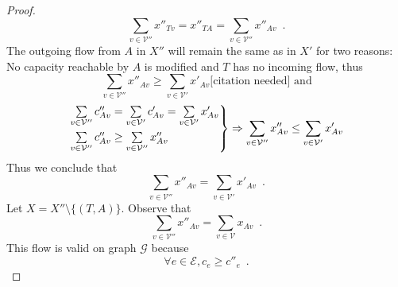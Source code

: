 \documentclass[11pt]{llncs}
\begin{document}
\begin{proof}
       \begin{equation}
          \sum\limits_{v \in \mathcal{V}''}x''_{Tv} = x''_{TA} = \sum\limits_{v \in \mathcal{V}''}x''_{Av} \enspace.
       \end{equation}
       The outgoing flow from $A$ in $X''$ will remain the same as in $X'$ for two reasons: \\
       No capacity reachable by $A$ is modified and $T$ has no incoming flow, thus
       \begin{equation}
          \sum\limits_{v \in \mathcal{V}''}x''_{Av} \geq \sum\limits_{v \in \mathcal{V}'}x'_{Av} \mbox{[citation needed] and}
       \end{equation}
       \begin{equation}
          \begin{rcases}
             \sum\limits_{v \in \mathcal{V}''}c''_{Av} = \sum\limits_{v \in \mathcal{V}'}c'_{Av} = \sum\limits_{v \in
             \mathcal{V}'}x'_{Av} \\
             \sum\limits_{v \in \mathcal{V}''}c''_{Av} \geq \sum\limits_{v \in \mathcal{V}''}x''_{Av}
          \end{rcases}
          \Rightarrow \sum\limits_{v \in \mathcal{V}''}x''_{Av} \leq \sum\limits_{v \in \mathcal{V}'}x'_{Av}
       \end{equation}
       Thus we conclude that
       \begin{equation}
       \label{primeequaldoubleprime}
          \sum\limits_{v \in \mathcal{V}''}x''_{Av} = \sum\limits_{v \in \mathcal{V}'}x'_{Av} \enspace.
       \end{equation}
       Let $X = X'' \setminus \{(T, A)\}$. Observe that
       \begin{equation}
          \sum\limits_{v \in \mathcal{V}''}x''_{Av} = \sum\limits_{v \in \mathcal{V}}x_{Av} \enspace.
       \end{equation}
       This flow is valid on graph $\mathcal{G}$ because
       \begin{equation}
          \forall e \in \mathcal{E}, c_e \geq c''_e \enspace.
       \end{equation}

\end{proof}
\end{document}
